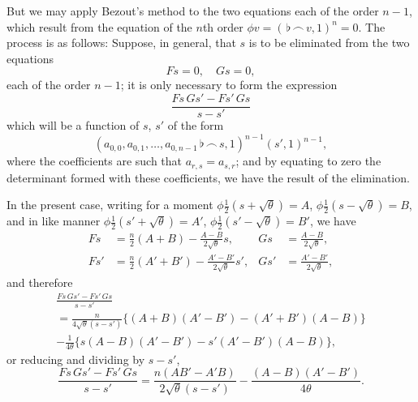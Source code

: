 \documentclass[11pt,a4paper]{book}
\begin{document}
But we may apply Bezout's method to the two equations each of the order $n-1$, which result from the equation of the $n$th order $\phi v=(\,\flat\,\frown\, v,1)^n=0$. The process is as follows: Suppose, in general, that $s$ is to be eliminated from the two equations
\[
Fs=0,\quad Gs=0,
\]
each of the order $n-1$; it is only necessary to form the expression
\[
\frac{Fs\,Gs'-Fs'\,Gs}{s-s'}
\]
which will be a function of $s$, $s'$ of the form
\[
(a_{0,0},a_{0,1},\ldots,a_{0,n-1}\,\flat\,\frown\, s,1)^{n-1}(s',1)^{n-1},
\]
where the coefficients are such that $a_{r,s}=a_{s,r}$; and by equating to zero the determinant formed with these coefficients, we have the result of the elimination.

In the present case, writing for a moment $\phi\tfrac{1}{2}(s+\sqrt{\theta})=A$, $\phi\tfrac{1}{2}(s-\sqrt{\theta})=B$, and in like manner $\phi\tfrac{1}{2}(s'+\sqrt{\theta})=A'$, $\phi\tfrac{1}{2}(s'-\sqrt{\theta})=B'$, we have
\begin{align*}
Fs &= \tfrac{n}{2}(A+B)-\frac{A-B}{2\sqrt{\theta}}s, & Gs &= \frac{A-B}{2\sqrt{\theta}},\\
Fs' &= \tfrac{n}{2}(A'+B')-\frac{A'-B'}{2\sqrt{\theta}}s', & Gs' &= \frac{A'-B'}{2\sqrt{\theta}},
\end{align*}
and therefore
\begin{multline*}
\frac{Fs\,Gs'-Fs'\,Gs}{s-s'}\\
=\frac{n}{4\sqrt{\theta}(s-s')}\{(A+B)(A'-B')-(A'+B')(A-B)\}\\
-\frac{1}{4\theta}\{s(A-B)(A'-B')-s'(A'-B')(A-B)\},
\end{multline*}
or reducing and dividing by $s-s'$,
\[
\frac{Fs\,Gs'-Fs'\,Gs}{s-s'}=\frac{n(AB'-A'B)}{2\sqrt{\theta}(s-s')}-\frac{(A-B)(A'-B')}{4\theta}.
\]
\end{document}
